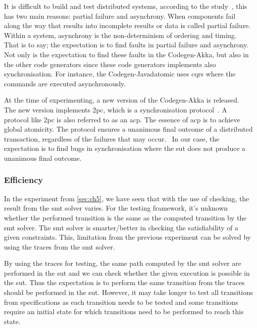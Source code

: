 It is difficult to build and test distributed systems, according to the
study~\cite[p.~1]{mccaffrey2016verification}, this has two main reasons: partial
failure and asynchrony. When components fail along the way that results into
incomplete results or data is called partial failure. Within a system,
asynchrony is the non-determinism of ordering and timing. That is to say; the
expectation is to find faults in partial failure and asynchrony. Not only is the
expectation to find these faults in the Codegen-Akka, but also in the other code
generators since these code generators implements also synchronisation. For
instance, the Codegen-Javadatomic uses \gls{cqrs} where the commands are
executed asynchronously.

At the time of experimenting, a new version of the Codegen-Akka is
released. The new version implements \gls{2pc}, which is a synchronisation
protocol~\cite[p.~3204]{al2009two}. A protocol like \gls{2pc} is also referred
to as an \gls{acp}. The essence of \gls{acp} is to achieve global atomicity. The
protocol ensures a unanimous final outcome of a distributed transaction,
regardless of the failures that may occur.~\cite[p.~3204]{al2009two} In our
case, the expectation is to find bugs in synchronisation where the \gls{sut}
does not produce a unanimous final outcome.

\subsubsection{Efficiency}
In the experiment from \autoref{sec:ch5}, we have seen that with the use of
checking, the result from the \gls{smt} solver varies. For the testing
framework, it's unknown whether the performed transition is the same as the
computed transition by the \gls{smt} solver. The \gls{smt} solver is
smarter/better in checking the satisfiability of a given constraints. This,
limitation from the previous experiment can be solved by using the traces from
the \gls{smt} solver.

By using the traces for testing, the same path computed by the \gls{smt} solver
are performed in the \gls{sut} and we can check whether the given
execution is possible in the \gls{sut}. Thus the expectation is to perform the
same transition from the traces should be performed in the \gls{sut}.
However, it may take longer to test all transitions from specifications as each
transition needs to be tested and some transitions require an initial state for
which transitions need to be performed to reach this state.

